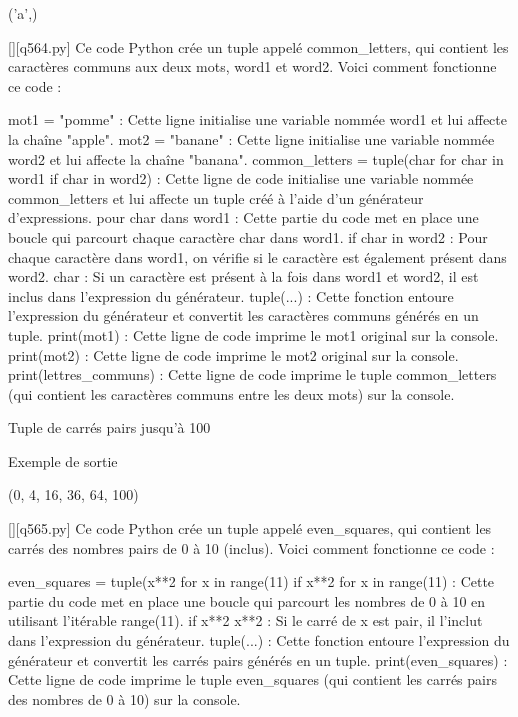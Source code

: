 ('a',)
        \par
        \begin{solution}
            \renewcommand{\nomfichier}{q564.py}
            \pythonfile{\chemincode \nomfichier}[][\nomfichier]
            Ce code Python crée un tuple appelé common_letters, qui contient les caractères communs aux deux mots, word1 et word2. Voici comment fonctionne ce code :

    mot1 = "pomme" : Cette ligne initialise une variable nommée word1 et lui affecte la chaîne "apple".
    mot2 = "banane" : Cette ligne initialise une variable nommée word2 et lui affecte la chaîne "banana".
    common_letters = tuple(char for char in word1 if char in word2) : Cette ligne de code initialise une variable nommée common_letters et lui affecte un tuple créé à l'aide d'un générateur d'expressions.
        pour char dans word1 : Cette partie du code met en place une boucle qui parcourt chaque caractère char dans word1.
        if char in word2 : Pour chaque caractère dans word1, on vérifie si le caractère est également présent dans word2.
        char : Si un caractère est présent à la fois dans word1 et word2, il est inclus dans l'expression du générateur.
        tuple(...) : Cette fonction entoure l'expression du générateur et convertit les caractères communs générés en un tuple.
    print(mot1) : Cette ligne de code imprime le mot1 original sur la console.
    print(mot2) : Cette ligne de code imprime le mot2 original sur la console.
    print(lettres_communs) : Cette ligne de code imprime le tuple common_letters (qui contient les caractères communs entre les deux mots) sur la console.
        \end{solution}
        

        \question
        Tuple de carrés pairs jusqu'à 100

Exemple de sortie

(0, 4, 16, 36, 64, 100)
        \par
        \begin{solution}
            \renewcommand{\nomfichier}{q565.py}
            \pythonfile{\chemincode \nomfichier}[][\nomfichier]
            Ce code Python crée un tuple appelé even_squares, qui contient les carrés des nombres pairs de 0 à 10 (inclus). Voici comment fonctionne ce code :

    even_squares = tuple(x**2 for x in range(11) if x**2 %
        for x in range(11) : Cette partie du code met en place une boucle qui parcourt les nombres de 0 à 10 en utilisant l'itérable range(11).
        if x**2 %
        x**2 : Si le carré de x est pair, il l'inclut dans l'expression du générateur.
        tuple(...) : Cette fonction entoure l'expression du générateur et convertit les carrés pairs générés en un tuple.
    print(even_squares) : Cette ligne de code imprime le tuple even_squares (qui contient les carrés pairs des nombres de 0 à 10) sur la console.
        \end{solution}
        


